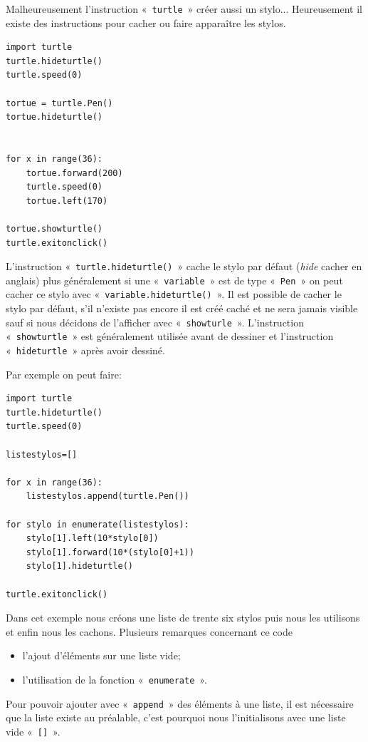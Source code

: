 Malheureusement l'instruction « \texttt{turtle} » créer aussi un stylo... Heureusement il existe des instructions pour cacher ou faire apparaître les stylos.

\begin{Verbatim}[frame=single,rulecolor=\color{mbleu}, label=à taper]
import turtle
turtle.hideturtle()
turtle.speed(0)

tortue = turtle.Pen()
tortue.hideturtle()


for x in range(36):
    tortue.forward(200)
    turtle.speed(0)
    tortue.left(170)

tortue.showturtle()    
turtle.exitonclick()
\end{Verbatim}

L'instruction « \texttt{turtle.hideturtle()} » cache le stylo par défaut (\emph{hide} cacher en anglais) plus généralement si une « \texttt{variable} »  est de type « \texttt{Pen} » on peut cacher ce stylo avec « \texttt{variable.hideturtle()} ». Il est possible de cacher le stylo par défaut, s'il n'existe pas encore il est créé caché et ne sera jamais visible sauf si nous décidons de l'afficher avec « \texttt{showturle} ». L'instruction  « \texttt{showturtle} » est généralement utilisée avant de dessiner et l'instruction « \texttt{hideturtle} » après avoir dessiné.

Par exemple on peut faire:
\begin{Verbatim}[frame=single,rulecolor=\color{mbleu}, label=à taper]
import turtle
turtle.hideturtle()
turtle.speed(0)

listestylos=[]

for x in range(36):
    listestylos.append(turtle.Pen())
    
for stylo in enumerate(listestylos): 
    stylo[1].left(10*stylo[0])
    stylo[1].forward(10*(stylo[0]+1))
    stylo[1].hideturtle()

turtle.exitonclick()
\end{Verbatim}

Dans cet exemple nous créons une liste de trente six stylos puis nous les utilisons et enfin nous les cachons.
Plusieurs remarques concernant ce code
\begin{itemize}
\item l'ajout d'éléments sur une liste vide;
\item l'utilisation de la fonction « \texttt{enumerate} ».
\end{itemize}

Pour pouvoir ajouter avec « \texttt{append} » des éléments à une liste, il est nécessaire que la liste existe au préalable, c'est pourquoi nous l'initialisons avec une liste vide « \texttt{[]} ».


